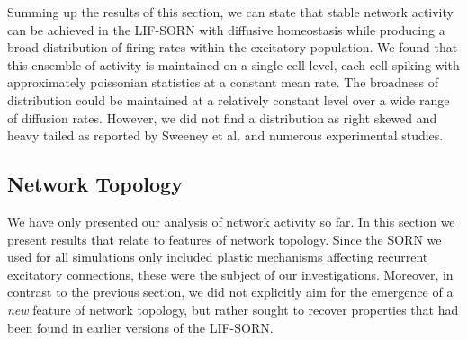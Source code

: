 \documentclass[10pt,a4paper]{article}
\begin{document}
Summing up the results of this section, we can state that stable network activity can be achieved in the LIF-SORN with diffusive homeostasis while producing a broad distribution of firing rates within the excitatory population. We found that this ensemble of activity is maintained on a single cell level, each cell spiking with approximately poissonian statistics at a constant mean rate. The broadness of distribution could be maintained at a relatively constant level over a wide range of diffusion rates. However, we did not find a distribution as right skewed and heavy tailed as reported by Sweeney et al. and numerous experimental studies.

\subsection{Network Topology}\label{Network_Topology_Section}
We have only presented our analysis of network activity so far. In this section we present results that relate to features of network topology. Since the SORN we used for all simulations only included plastic mechanisms affecting recurrent excitatory connections, these were the subject of our investigations. Moreover, in contrast to the previous section, we did not explicitly aim for the emergence of a \emph{new} feature of network topology, but rather sought to recover properties that had been found in earlier versions of the LIF-SORN.
\end{document}
